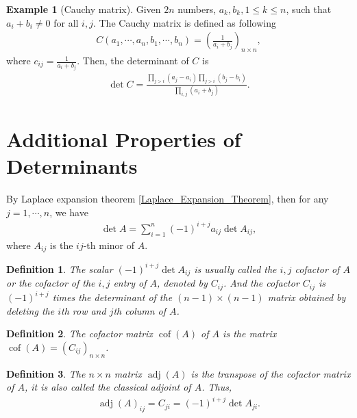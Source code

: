 \documentclass[11pt]{book}
\newtheorem{definition}{Definition}[chapter]
\theoremstyle{definition}
\newtheorem{example}{Example}[chapter]
\numberwithin{equation}{chapter}
\begin{document}
\medskip

\begin{example}[Cauchy matrix]
Given $2n$ numbers, $a_k, b_k, 1\leq k\leq n$, such that $a_i + b_i \neq 0$ for all $i,j$. The Cauchy matrix is defined as following
\begin{align*}
    C(a_1,\cdots,a_n, b_1,\cdots,b_n) = \left(\frac{1}{a_i + b_j}\right)_{n\times n}
,\end{align*}
where $c_{ij} = \frac{1}{a_i + b_j}$. Then, the determinant of $C$ is 
\begin{align*}
    \det C = \frac{\prod_{j>i}(a_j - a_i)\prod_{j>i}(b_j - b_i)}{\prod_{i,j}(a_i + b_j)}.
\end{align*}
\end{example}

\medskip

\section{Additional Properties of Determinants}
By Laplace expansion theorem \ref{Laplace_Expansion_Theorem}, then for any $j = 1, \cdots, n$, we have
\begin{align*}
    \det A = \sum^n_{i=1} (-1)^{i+j} a_{ij} \det A_{ij},
\end{align*}
where $A_{ij}$ is the $ij$-th minor of $A$.

\medskip

\begin{definition}
The scalar $(-1)^{i+j} \det A_{ij}$ is usually called the $i,j$ cofactor of $A$ or the cofactor of the $i,j$ entry of $A$, denoted by $C_{ij}$. And the cofactor $C_{ij}$ is $(-1)^{i+j}$ times the determinant of the $(n-1) \times (n-1)$ matrix obtained by deleting the $i$th row and $j$th column of $A$.
\end{definition}

\medskip

\begin{definition}
The cofactor matrix $\operatorname{cof}(A)$ of $A$ is the matrix $\operatorname{cof}(A) = \left(C_{ij}\right)_{n \times n}$.
\end{definition}

\medskip

\begin{definition}
The $n \times n$ matrix $\operatorname{adj}(A)$ is the transpose of the cofactor matrix of $A$, it is also called the classical adjoint of $A$. Thus, 
\begin{align*}
    \operatorname{adj}(A)_{ij} = C_{ji} = (-1)^{i+j} \det A_{ji}.
\end{align*}
\end{definition}
\end{document}
